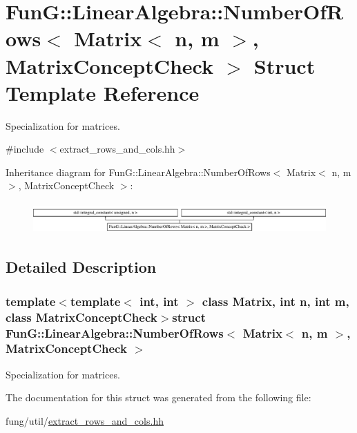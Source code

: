 \hypertarget{structFunG_1_1LinearAlgebra_1_1NumberOfRows_3_01Matrix_3_01n_00_01m_01_4_00_01MatrixConceptCheck_01_4}{}\section{Fun\+G\+:\+:Linear\+Algebra\+:\+:Number\+Of\+Rows$<$ Matrix$<$ n, m $>$, Matrix\+Concept\+Check $>$ Struct Template Reference}
\label{structFunG_1_1LinearAlgebra_1_1NumberOfRows_3_01Matrix_3_01n_00_01m_01_4_00_01MatrixConceptCheck_01_4}


Specialization for matrices.  




{\ttfamily \#include $<$extract\+\_\+rows\+\_\+and\+\_\+cols.\+hh$>$}

Inheritance diagram for Fun\+G\+:\+:Linear\+Algebra\+:\+:Number\+Of\+Rows$<$ Matrix$<$ n, m $>$, Matrix\+Concept\+Check $>$\+:\begin{figure}[H]
\begin{center}
\leavevmode
\includegraphics[height=1.199143cm]{structFunG_1_1LinearAlgebra_1_1NumberOfRows_3_01Matrix_3_01n_00_01m_01_4_00_01MatrixConceptCheck_01_4}
\end{center}
\end{figure}


\subsection{Detailed Description}
\subsubsection*{template$<$template$<$ int, int $>$ class Matrix, int n, int m, class Matrix\+Concept\+Check$>$struct Fun\+G\+::\+Linear\+Algebra\+::\+Number\+Of\+Rows$<$ Matrix$<$ n, m $>$, Matrix\+Concept\+Check $>$}

Specialization for matrices. 

The documentation for this struct was generated from the following file\+:\begin{DoxyCompactItemize}
\item 
fung/util/\hyperlink{extract__rows__and__cols_8hh}{extract\+\_\+rows\+\_\+and\+\_\+cols.\+hh}\end{DoxyCompactItemize}

